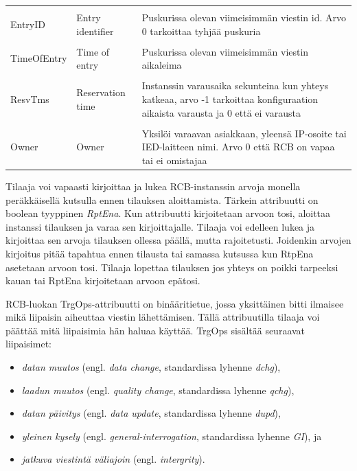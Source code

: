 \begin{table}[ht!]
\begin{tabular}{l | l | l}
		&\\
		EntryID & Entry identifier & \parbox[t]{7.5cm}{Puskurissa olevan viimeisimmän viestin id. Arvo 0 tarkoittaa tyhjää puskuria} \\
		&\\
		TimeOfEntry & Time of entry & \parbox[t]{7.5cm}{Puskurissa olevan viimeisimmän viestin aikaleima} \\
		&\\
		ResvTms & Reservation time & \parbox[t]{7.5cm}{Instanssin varausaika sekunteina kun yhteys katkeaa, arvo -1 tarkoittaa konfiguraation aikaista varausta ja 0 että ei varausta} \\
		&\\
		Owner & Owner & \parbox[t]{7.5cm}{Yksilöi varaavan asiakkaan, yleensä IP-osoite tai IED-laitteen nimi. Arvo 0 että RCB on vapaa tai ei omistajaa} \\
		\hline
	\end{tabular}
\end{table}

Tilaaja voi vapaasti kirjoittaa ja lukea RCB-instanssin arvoja monella peräkkäisellä kutsulla ennen tilauksen aloittamista. Tärkein attribuutti on boolean tyyppinen \emph{RptEna}. Kun attribuutti kirjoitetaan arvoon tosi, aloittaa instanssi tilauksen ja varaa sen kirjoittajalle. Tilaaja voi edelleen lukea ja kirjoittaa sen arvoja tilauksen ollessa päällä, mutta rajoitetusti. Joidenkin arvojen kirjoitus pitää tapahtua ennen tilausta tai samassa kutsussa kun RtpEna asetetaan arvoon tosi. Tilaaja lopettaa tilauksen jos yhteys on poikki tarpeeksi kauan tai RptEna kirjoitetaan arvoon epätosi.

RCB-luokan TrgOps-attribuutti on binääritietue, jossa yksittäinen bitti ilmaisee mikä liipaisin aiheuttaa viestin lähettämisen. Tällä attribuutilla tilaaja voi päättää mitä liipaisimia hän haluaa käyttää. TrgOps sisältää seuraavat liipaisimet:
\begin{itemize}
	\item \emph{datan muutos} (engl. \emph{data change}, standardissa lyhenne \emph{dchg}),
	\item \emph{laadun muutos} (engl. \emph{quality change}, standardissa lyhenne \emph{qchg}),
	\item \emph{datan päivitys} (engl. \emph{data update}, standardissa lyhenne \emph{dupd}),
	\item \emph{yleinen kysely} (engl. \emph{general-interrogation}, standardissa lyhenne \emph{GI}), ja 
	\item \emph{jatkuva viestintä väliajoin} (engl. \emph{intergrity}).
\end{itemize}

